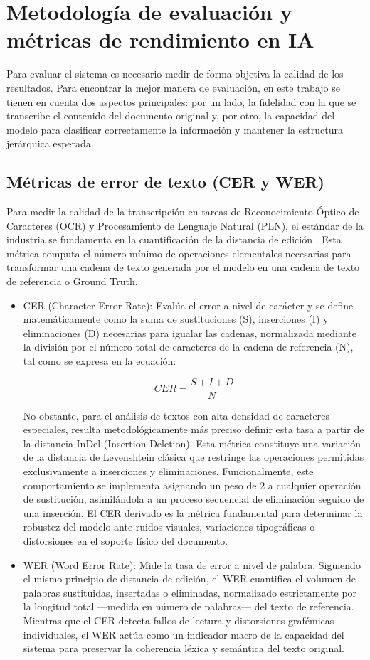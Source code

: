 \section{  Metodología de evaluación y métricas de rendimiento en IA }


Para evaluar el sistema es necesario medir de forma objetiva la calidad de los resultados. Para encontrar la mejor manera de evaluación, en este trabajo se tienen en cuenta dos aspectos principales: por un lado, la fidelidad con la que se transcribe el contenido del documento original y, por otro, la capacidad del modelo para clasificar correctamente la información y mantener la estructura jerárquica esperada.


\subsection{  Métricas de error de texto (CER y WER) }
Para medir la calidad de la transcripción en tareas de Reconocimiento Óptico de Caracteres (OCR) y Procesamiento de Lenguaje Natural (PLN), el estándar de la industria se fundamenta en la cuantificación de la distancia de edición \parencite{echavarria:hal-05267874}. Esta métrica computa el número mínimo de operaciones elementales necesarias para transformar una cadena de texto generada por el modelo en una cadena de texto de referencia o Ground Truth.
\begin{itemize}
    \item CER (Character Error Rate): Evalúa el error a nivel de carácter y se define matemáticamente como la suma de sustituciones (S), inserciones (I) y eliminaciones (D) necesarias para igualar las cadenas, normalizada mediante la división por el número total de caracteres de la cadena de referencia (N), tal como se expresa en la ecuación:


\[
CER = \frac{S + I + D}{N}
\]


No obstante, para el análisis de textos con alta densidad de caracteres especiales, resulta metodológicamente más preciso definir esta tasa a partir de la distancia InDel (Insertion-Deletion). Esta métrica constituye una variación de la distancia de Levenshtein clásica que restringe las operaciones permitidas exclusivamente a inserciones y eliminaciones. Funcionalmente, este comportamiento se implementa asignando un peso de 2 a cualquier operación de sustitución, asimilándola a un proceso secuencial de eliminación seguido de una inserción. El CER derivado es la métrica fundamental para determinar la robustez del modelo ante ruidos visuales, variaciones tipográficas o distorsiones en el soporte físico del documento.

    \item WER (Word Error Rate): Mide la tasa de error a nivel de palabra. Siguiendo el mismo principio de distancia de edición, el WER cuantifica el volumen de palabras sustituidas, insertadas o eliminadas, normalizado estrictamente por la longitud total —medida en número de palabras— del texto de referencia. Mientras que el CER detecta fallos de lectura y distorsiones grafémicas individuales, el WER actúa como un indicador macro de la capacidad del sistema para preservar la coherencia léxica y semántica del texto original.
\end{itemize}

